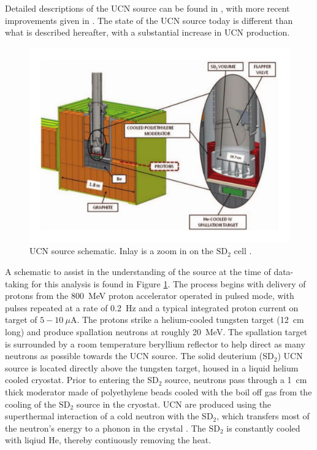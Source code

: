 Detailed descriptions of the UCN source can be found in
\cite{saunders2004demonstration,morris2002measurements,saunders2013performance}, with
more recent improvements given in \cite{ito2017performance}. The state of the
UCN source today is different than what is described hereafter, with a substantial
increase in UCN production.

\begin{figure}[h]
  \centering
  \includegraphics[scale=0.48]{2-UCNAExperiment/source_figure.pdf} 
  \caption{UCN source schematic. Inlay is a zoom in on the
    $\mathrm{SD}_2$ cell \cite{saunders2013performance}.}
  \label{fig:sourceFig}
\end{figure}

A schematic to assist in the understanding of the source at the time of data-taking
for this analysis is found in Figure
\ref{fig:sourceFig}. The process begins with delivery of protons from the 800~MeV proton
accelerator operated in pulsed mode, with pulses repeated at a rate of 0.2~Hz and a typical
integrated proton current on target of $5-10~\mu$A.
The protons strike a helium-cooled tungsten target (12~cm long) and produce
spallation neutrons at roughly 20~MeV. The spallation target is surrounded by
a room temperature beryllium reflector to help direct as many neutrons as
possible towards the UCN source. The solid deuterium ($\mathrm{SD}_2$) UCN source
is located directly above the tungsten target, housed in a liquid helium
cooled cryostat. Prior to entering the $\mathrm{SD}_2$ source, neutrons
pass through a 1~cm thick moderator made of polyethylene beads cooled with the boil off gas
from the cooling of the $\mathrm{SD}_2$ source in the cryostat.
UCN are produced using the superthermal interaction of a cold neutron with the $\mathrm{SD}_2$,
which transfers most of the neutron's energy to a phonon in the crystal \cite{golub1991ultra}.
The $\mathrm{SD}_2$ is constantly cooled with liqiud He, thereby contiuously removing
the heat. 

